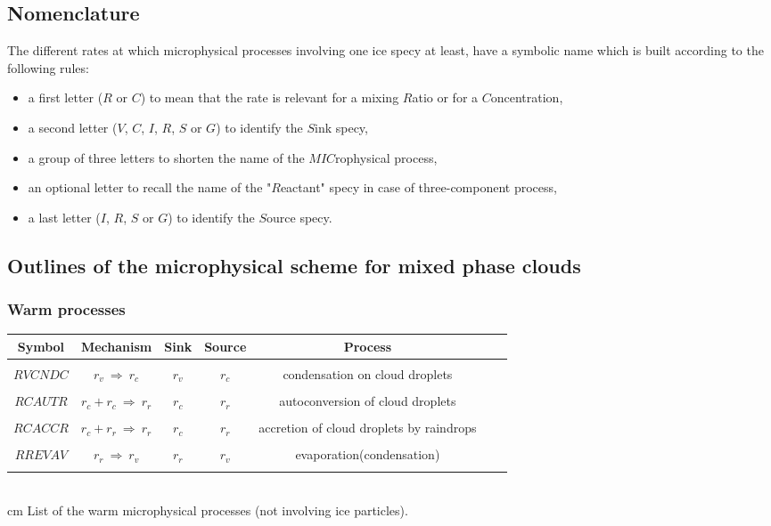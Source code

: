 %
\subsection{Nomenclature}
%

The different rates at which microphysical processes involving one ice specy
at least, have a symbolic name which is built according to the following rules:
\begin{itemize}
\item a first letter ($R$ or $C$) to mean that the rate is relevant for a
mixing $R$atio or for a $C$oncentration,
\item a second letter ($V$, $C$, $I$, $R$, $S$ or $G$) to identify the $S$ink
specy,
\item a group of three letters to shorten the name of the $MIC$rophysical process,
\item an optional letter to recall the name of the "$R$eactant" specy in case of
three-component process,
\item a last letter ($I$, $R$, $S$ or $G$) to identify the $S$ource specy.
\end{itemize}


%
\subsection{Outlines of the microphysical scheme for mixed phase clouds}
%

%
\subsubsection{Warm processes}
%
\vskip 1cm

\begin{center}\label{table5}
\begin{tabular}{|c|c|c|c|c|c|c|}
\hline
Symbol & Mechanism & Sink & Source & Process \\
\hline \hline
 & & & & \\
$RVCNDC$ & $r_v\ \Longrightarrow \ r_c$ & $r_v$ & $r_c$ & condensation on cloud droplets \\
 & & & & \\
$RCAUTR$ & $r_c+r_c\ \Longrightarrow \ r_r$ & $r_c$ & $r_r$ & autoconversion of cloud droplets \\
 & & & & \\
$RCACCR$ & $r_c+r_r\ \Longrightarrow \ r_r$ & $r_c$ & $r_r$ & accretion of cloud droplets by raindrops \\
 & & & & \\
$RREVAV$ & $r_r\ \Longrightarrow \ r_v$ & $r_r$ & $r_v$ & evaporation(condensation) \\
 & & & & \\
\hline
\end{tabular}
\\
 cm
List of the warm microphysical processes (not involving ice particles).
\end{center}

